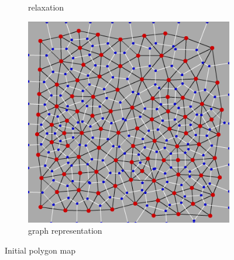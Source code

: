 \documentclass[journal, letterpaper]{IEEEtran}
\begin{document}
\begin{figure}
\begin{subfigure}[b]{0.3\textwidth}
		\caption{relaxation}
		\label{fig:relaxation}
	\end{subfigure}
	\begin{subfigure}[b]{0.3\textwidth}
		\includegraphics[width=\textwidth]{images/voronoi-and-delaunay}
		\caption{graph representation}
		\label{fig:graph}
	\end{subfigure}
	\caption{Initial polygon map}\label{fig:PolygonalMap}
\end{figure}
\end{document}
